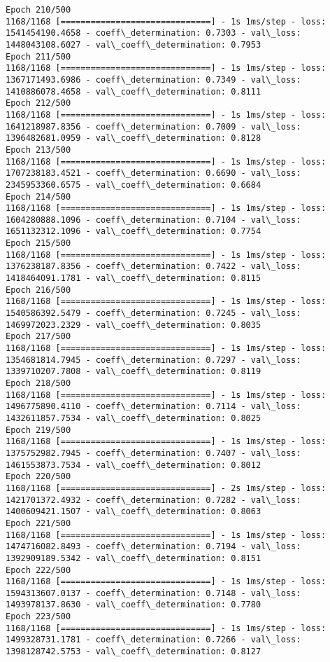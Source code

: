 \documentclass[11pt]{article}
\begin{document}
\begin{Verbatim}[commandchars=\\\{\}]
Epoch 210/500
1168/1168 [==============================] - 1s 1ms/step - loss: 1541454190.4658 - coeff\_determination: 0.7303 - val\_loss: 1448043108.6027 - val\_coeff\_determination: 0.7953
Epoch 211/500
1168/1168 [==============================] - 1s 1ms/step - loss: 1367171493.6986 - coeff\_determination: 0.7349 - val\_loss: 1410886078.4658 - val\_coeff\_determination: 0.8111
Epoch 212/500
1168/1168 [==============================] - 1s 1ms/step - loss: 1641218987.8356 - coeff\_determination: 0.7009 - val\_loss: 1396482681.0959 - val\_coeff\_determination: 0.8128
Epoch 213/500
1168/1168 [==============================] - 1s 1ms/step - loss: 1707238183.4521 - coeff\_determination: 0.6690 - val\_loss: 2345953360.6575 - val\_coeff\_determination: 0.6684
Epoch 214/500
1168/1168 [==============================] - 1s 1ms/step - loss: 1604280888.1096 - coeff\_determination: 0.7104 - val\_loss: 1651132312.1096 - val\_coeff\_determination: 0.7754
Epoch 215/500
1168/1168 [==============================] - 1s 1ms/step - loss: 1376238187.8356 - coeff\_determination: 0.7422 - val\_loss: 1418464091.1781 - val\_coeff\_determination: 0.8115
Epoch 216/500
1168/1168 [==============================] - 1s 1ms/step - loss: 1540586392.5479 - coeff\_determination: 0.7245 - val\_loss: 1469972023.2329 - val\_coeff\_determination: 0.8035
Epoch 217/500
1168/1168 [==============================] - 1s 1ms/step - loss: 1354681814.7945 - coeff\_determination: 0.7297 - val\_loss: 1339710207.7808 - val\_coeff\_determination: 0.8119
Epoch 218/500
1168/1168 [==============================] - 1s 1ms/step - loss: 1496775890.4110 - coeff\_determination: 0.7114 - val\_loss: 1432611857.7534 - val\_coeff\_determination: 0.8025
Epoch 219/500
1168/1168 [==============================] - 1s 1ms/step - loss: 1375752982.7945 - coeff\_determination: 0.7407 - val\_loss: 1461553873.7534 - val\_coeff\_determination: 0.8012
Epoch 220/500
1168/1168 [==============================] - 2s 1ms/step - loss: 1421701372.4932 - coeff\_determination: 0.7282 - val\_loss: 1400609421.1507 - val\_coeff\_determination: 0.8063
Epoch 221/500
1168/1168 [==============================] - 1s 1ms/step - loss: 1474716082.8493 - coeff\_determination: 0.7194 - val\_loss: 1392909189.5342 - val\_coeff\_determination: 0.8151
Epoch 222/500
1168/1168 [==============================] - 1s 1ms/step - loss: 1594313607.0137 - coeff\_determination: 0.7148 - val\_loss: 1493978137.8630 - val\_coeff\_determination: 0.7780
Epoch 223/500
1168/1168 [==============================] - 1s 1ms/step - loss: 1499328731.1781 - coeff\_determination: 0.7266 - val\_loss: 1398128742.5753 - val\_coeff\_determination: 0.8127

\end{Verbatim}
\end{document}

